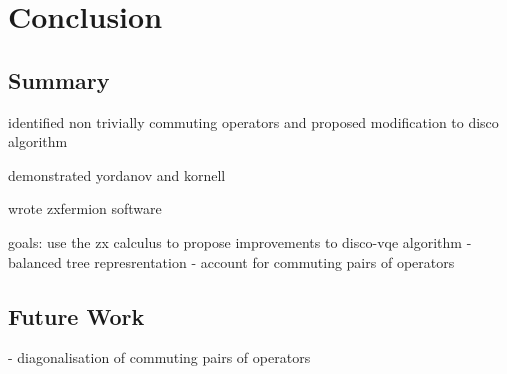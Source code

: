 \chapter{Conclusion}%
\label{conclusion}

\section{Summary}

identified non trivially commuting operators and proposed modification to disco algorithm

demonstrated yordanov and kornell

wrote zxfermion software


goals:
use the zx calculus to propose improvements to disco-vqe algorithm
- balanced tree represrentation
- account for commuting pairs of operators

\section{Future Work}

- diagonalisation of commuting pairs of operators

